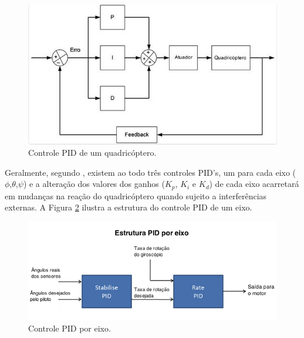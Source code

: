 \documentclass[a4paper, 12pt]{article}
\begin{document}
\begin{figure}[h]
	\centering
		\includegraphics[scale=0.6]{img/PID_quad_geral.png}
	\caption{Controle PID de um quadricóptero.}
	\label{fig:PIDquad}
\end{figure}


Geralmente, segundo \cite{Liang}, existem ao todo três controles PID's, um para cada eixo ($\phi$,$\theta$,$\psi$) e a alteração dos valores dos ganhos ($K_p$, $K_i$ e $K_d$) de cada eixo acarretará em mudanças na reação do quadricóptero quando sujeito a interferências externas. A Figura \ref{fig:PIDaxis} ilustra a estrutura do controle PID de um eixo.



\begin{figure}[h]
	\centering
		\includegraphics[scale=0.6]{img/PID_quad_axis.png}
	\caption{Controle PID por eixo.}
	\label{fig:PIDaxis}
\end{figure}
\end{document}
